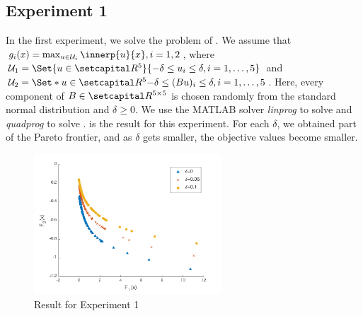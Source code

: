 \documentclass[../main]{subfiles}
\begin{document}
\subsection*{Experiment 1}
In the first experiment, we solve the problem of . We assume that $g_i(x) = \max_{u \in \mathcal{U}_i } \innerp{u}{x}, i = 1,2$, where $\mathcal{U}_1 = \Set{u \in \setR^5}{-\delta \leq u_i \leq \delta, i = 1,\dots,5 }$ and $\mathcal{U}_2 = \Set*{u \in \setR^5}{-\delta \leq (Bu)_i \leq \delta, i = 1,\dots,5 }$.
Here, every component of $B \in \setR^{5 \times 5}$ is chosen randomly from the standard normal distribution and $\delta \geq 0$.
We use the MATLAB solver \emph{linprog} to solve  and \emph{quadprog} to solve .  is the result for this experiment.
For each $\delta$, we obtained part of the Pareto frontier, and as $\delta$ gets smaller, the objective values become smaller.
\begin{figure}[htbp]
    \centering
    \includegraphics[clip, width = 7.0cm]{figs/linear_polyhedron_without_line_search}
    \caption{Result for Experiment 1}
\end{figure}
\end{document}
